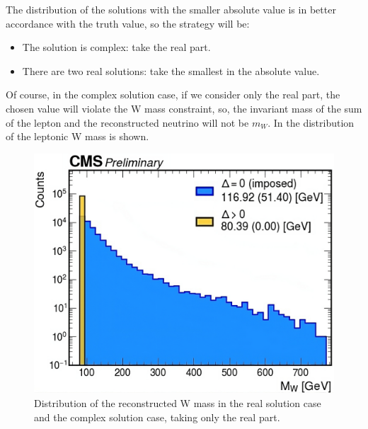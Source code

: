 The distribution of the solutions with the smaller absolute value is in better accordance with the truth value, so the strategy will be:\\
\begin{minipage}{\linewidth}
    \begin{minipage}{0.42\linewidth}

\begin{itemize}
    \item The solution is complex: take the real part.
    \item There are two real solutions: take the smallest in the absolute value.
\end{itemize}

        Of course, in the complex solution case, if we consider only the real part, the chosen value will violate the W mass constraint, so, the invariant mass of the sum of the lepton and the reconstructed neutrino will not be $m_W$. In   the distribution of the leptonic W mass is shown.
    \end{minipage}
    \hfill
    \begin{minipage}{0.55\linewidth}
    \vspace{-0.2cm}
    \begin{figure}[H]
    \centering
    \includegraphics[width=\linewidth]{fig//chap07-selection/Wmass_reconstructed.png}
    \caption{Distribution of the reconstructed W mass in the real solution case and the complex solution case, taking only the real part.}
    \label{fig:LeptW_reco}
\end{figure}
        
    \end{minipage}

\end{minipage}
